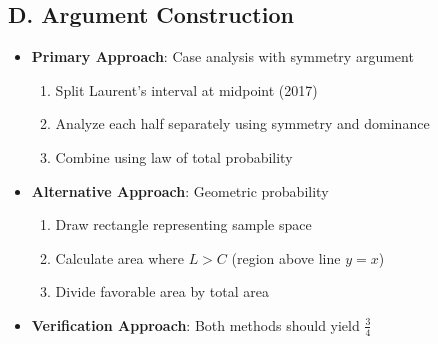 \documentclass[]{article}
\begin{document}
\begin{strategicbox}
\subsection*{D. Argument Construction}
\begin{itemize}[leftmargin=*]
    \item \textbf{Primary Approach}: Case analysis with symmetry argument
    \begin{enumerate}
        \item Split Laurent's interval at midpoint (2017)
        \item Analyze each half separately using symmetry and dominance
        \item Combine using law of total probability
    \end{enumerate}
    
    \item \textbf{Alternative Approach}: Geometric probability
    \begin{enumerate}
        \item Draw rectangle representing sample space
        \item Calculate area where $L > C$ (region above line $y = x$)
        \item Divide favorable area by total area
    \end{enumerate}
    
    \item \textbf{Verification Approach}: Both methods should yield $\frac{3}{4}$
\end{itemize}
\end{strategicbox}
\end{document}
